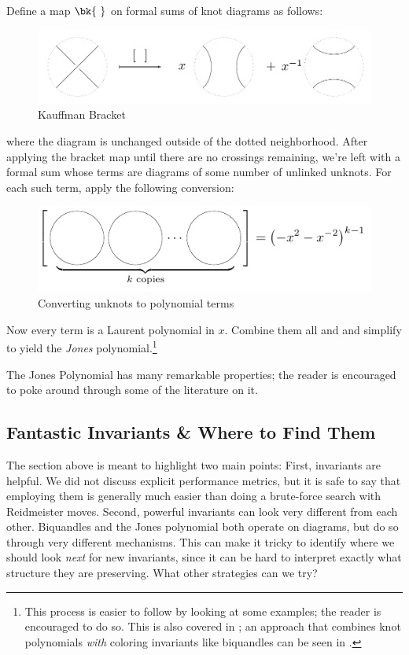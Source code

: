 \begin{example}
  Define a map $\bk{\ }$ on formal sums of knot diagrams as follows:
  \begin{figure}[H]
    \centering
    \includegraphics[scale=.55]{figures/fundamentals/jones-polynomial.pdf}
    \caption{Kauffman Bracket}
  \end{figure}
  where the diagram is unchanged outside of the dotted neighborhood.
  After applying the bracket map until there are no crossings
  remaining, we're left with a formal sum whose terms are diagrams of
  some number of unlinked unknots. For each such term, apply the
  following conversion:
  \begin{figure}[H]
    \centering
    \includegraphics[scale=1]{figures/fundamentals/jones-delta.pdf}
    \caption{Converting unknots to polynomial terms}
  \end{figure}
  Now every term is a Laurent polynomial in $x$. Combine them all and
  and simplify to yield the \emph{Jones} polynomial.\footnote{This
    process is easier to follow by looking at some examples; the
    reader is encouraged to do so. This is also covered in
    \cite{NelsonBook}; an approach that combines knot polynomials
    \emph{with} coloring invariants like biquandles can be seen in
    \cite{Nelson2017Feb}.}
\end{example}
The Jones Polynomial has many remarkable properties; the reader is
encouraged to poke around through some of the literature on it.

\subsection{Fantastic Invariants \& Where to Find Them}
The section above is meant to highlight two main points: First,
invariants are helpful. We did not discuss explicit performance
metrics, but it is safe to say that employing them is generally much
easier than doing a brute-force search with Reidmeister moves. Second,
powerful invariants can look very different from each other.
Biquandles and the Jones polynomial both operate on diagrams, but do
so through very different mechanisms. This can make it tricky to
identify where we should look \emph{next} for new invariants, since it
can be hard to interpret exactly what structure they are preserving.
What other strategies can we try?

